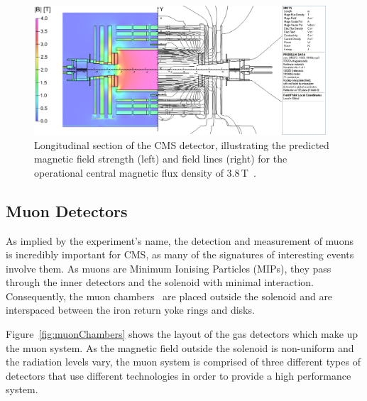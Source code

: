 \begin{figure}[htb]
\begin{center}
\includegraphics[width=0.97\textwidth]{figs/cms/cms_magnetic_field.png}
\caption{Longitudinal section of the CMS detector, illustrating the predicted magnetic field strength (left) and field lines (right) for the operational central magnetic flux density of 3.8\,T~\cite{Chatrchyan:2009si}.}
\label{fig:magneticField}
\end{center}
\end{figure}

\subsection{Muon Detectors}\label{subsec:muon chambers}
As implied by the experiment's name, the detection and measurement of muons is incredibly important for CMS, as many of the signatures of interesting events involve them.
As muons are Minimum Ionising Particles (MIPs), they pass through the inner detectors and the solenoid with minimal interaction.
Consequently, the muon chambers~\cite{CMS:1997iti} are placed outside the solenoid and are interspaced between the iron return yoke rings and disks.

Figure~\ref{fig:muonChambers} shows the layout of the gas detectors which make up the muon system.
As the magnetic field outside the solenoid is non-uniform and the radiation levels vary, the muon system is comprised of three different types of detectors that use different technologies in order to provide a high performance system. 

